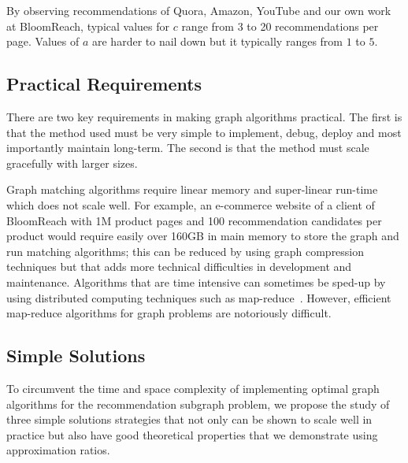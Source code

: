 By observing recommendations of Quora, Amazon, YouTube and our own
work at BloomReach, typical values for $c$ range from 3 to 20
recommendations per page. Values of $a$ are harder to nail down but it
typically ranges from $1$ to $5$. 


\subsection{Practical Requirements}

There are two key requirements in making graph algorithms
practical. The first is that the method used must be very simple to
implement, debug, deploy and most importantly maintain long-term. The second is that the method must scale
gracefully with larger sizes. \vs

Graph matching algorithms require linear memory and super-linear run-time
which does not scale well. For example, an e-commerce website of a
client of BloomReach with 1M product pages and 100 recommendation
candidates per product would require easily over 160GB in main memory to store the graph
and run matching algorithms; this can be reduced by using graph
compression techniques but that adds more technical difficulties in
development and maintenance. Algorithms that are time intensive
can sometimes be sped-up by using distributed computing techniques such as
map-reduce~\cite{DeanGhemawat2004}. However, efficient map-reduce
algorithms for graph problems are notoriously difficult. \vs

\subsection{Simple Solutions}

To circumvent the time and space complexity of implementing optimal
graph algorithms for the recommendation subgraph problem, we propose
the study of three simple solutions strategies that not only can be
shown to scale well in practice but also have good theoretical
properties that we demonstrate using approximation ratios.

